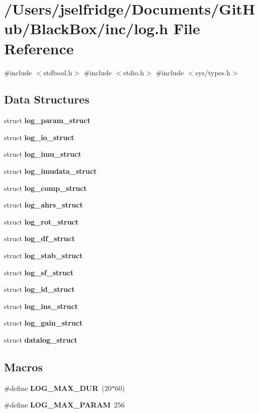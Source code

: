 \section{/\+Users/jselfridge/\+Documents/\+Git\+Hub/\+Black\+Box/inc/log.h File Reference}
\label{log_8h}
{\ttfamily \#include $<$stdbool.\+h$>$}\newline
{\ttfamily \#include $<$stdio.\+h$>$}\newline
{\ttfamily \#include $<$sys/types.\+h$>$}\newline
\subsection*{Data Structures}
\begin{DoxyCompactItemize}
\item 
struct \textbf{ log\+\_\+param\+\_\+struct}
\item 
struct \textbf{ log\+\_\+io\+\_\+struct}
\item 
struct \textbf{ log\+\_\+imu\+\_\+struct}
\item 
struct \textbf{ log\+\_\+imudata\+\_\+struct}
\item 
struct \textbf{ log\+\_\+comp\+\_\+struct}
\item 
struct \textbf{ log\+\_\+ahrs\+\_\+struct}
\item 
struct \textbf{ log\+\_\+rot\+\_\+struct}
\item 
struct \textbf{ log\+\_\+df\+\_\+struct}
\item 
struct \textbf{ log\+\_\+stab\+\_\+struct}
\item 
struct \textbf{ log\+\_\+sf\+\_\+struct}
\item 
struct \textbf{ log\+\_\+id\+\_\+struct}
\item 
struct \textbf{ log\+\_\+ins\+\_\+struct}
\item 
struct \textbf{ log\+\_\+gain\+\_\+struct}
\item 
struct \textbf{ datalog\+\_\+struct}
\end{DoxyCompactItemize}
\subsection*{Macros}
\begin{DoxyCompactItemize}
\item 
\#define \textbf{ L\+O\+G\+\_\+\+M\+A\+X\+\_\+\+D\+UR}~(20$\ast$60)
\item 
\#define \textbf{ L\+O\+G\+\_\+\+M\+A\+X\+\_\+\+P\+A\+R\+AM}~256
\end{DoxyCompactItemize}
